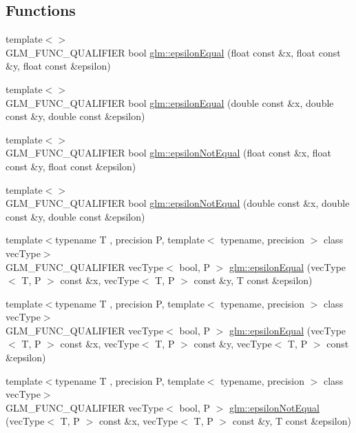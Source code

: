 \subsection*{Functions}
\begin{DoxyCompactItemize}
\item 
{\footnotesize template$<$$>$ }\\G\+L\+M\+\_\+\+F\+U\+N\+C\+\_\+\+Q\+U\+A\+L\+I\+F\+I\+E\+R bool \hyperlink{namespaceglm_aded5e7ea9a0eacd03367ad77986c2a15}{glm\+::epsilon\+Equal} (float const \&x, float const \&y, float const \&epsilon)
\item 
{\footnotesize template$<$$>$ }\\G\+L\+M\+\_\+\+F\+U\+N\+C\+\_\+\+Q\+U\+A\+L\+I\+F\+I\+E\+R bool \hyperlink{namespaceglm_a6e30ea38a0e3ebc25d87e667255057e5}{glm\+::epsilon\+Equal} (double const \&x, double const \&y, double const \&epsilon)
\item 
{\footnotesize template$<$$>$ }\\G\+L\+M\+\_\+\+F\+U\+N\+C\+\_\+\+Q\+U\+A\+L\+I\+F\+I\+E\+R bool \hyperlink{namespaceglm_af4127d65f4afc6e447d461bae25f90fe}{glm\+::epsilon\+Not\+Equal} (float const \&x, float const \&y, float const \&epsilon)
\item 
{\footnotesize template$<$$>$ }\\G\+L\+M\+\_\+\+F\+U\+N\+C\+\_\+\+Q\+U\+A\+L\+I\+F\+I\+E\+R bool \hyperlink{namespaceglm_a68d8ce38812c8599018e404afc79f088}{glm\+::epsilon\+Not\+Equal} (double const \&x, double const \&y, double const \&epsilon)
\item 
{\footnotesize template$<$typename T , precision P, template$<$ typename, precision $>$ class vec\+Type$>$ }\\G\+L\+M\+\_\+\+F\+U\+N\+C\+\_\+\+Q\+U\+A\+L\+I\+F\+I\+E\+R vec\+Type$<$ bool, P $>$ \hyperlink{group__gtc__epsilon_gaca9443f217dc36587624247245522331}{glm\+::epsilon\+Equal} (vec\+Type$<$ T, P $>$ const \&x, vec\+Type$<$ T, P $>$ const \&y, T const \&epsilon)
\item 
{\footnotesize template$<$typename T , precision P, template$<$ typename, precision $>$ class vec\+Type$>$ }\\G\+L\+M\+\_\+\+F\+U\+N\+C\+\_\+\+Q\+U\+A\+L\+I\+F\+I\+E\+R vec\+Type$<$ bool, P $>$ \hyperlink{namespaceglm_abc7f87cb473f9c9d7d6109e96c139807}{glm\+::epsilon\+Equal} (vec\+Type$<$ T, P $>$ const \&x, vec\+Type$<$ T, P $>$ const \&y, vec\+Type$<$ T, P $>$ const \&epsilon)
\item 
{\footnotesize template$<$typename T , precision P, template$<$ typename, precision $>$ class vec\+Type$>$ }\\G\+L\+M\+\_\+\+F\+U\+N\+C\+\_\+\+Q\+U\+A\+L\+I\+F\+I\+E\+R vec\+Type$<$ bool, P $>$ \hyperlink{namespaceglm_a76da74051c42eebf3256cd31464fa043}{glm\+::epsilon\+Not\+Equal} (vec\+Type$<$ T, P $>$ const \&x, vec\+Type$<$ T, P $>$ const \&y, T const \&epsilon)

\end{DoxyCompactItemize}

